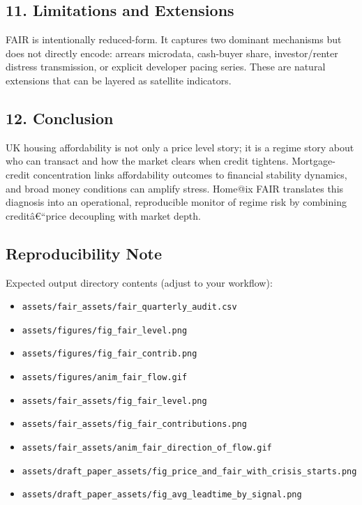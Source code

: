 \subsection{11. Limitations and
Extensions}\label{limitations-and-extensions}

FAIR is intentionally reduced-form. It captures two dominant mechanisms
but does not directly encode: arrears microdata, cash-buyer share,
investor/renter distress transmission, or explicit developer pacing
series. These are natural extensions that can be layered as satellite
indicators.

\subsection{12. Conclusion}\label{conclusion}

UK housing affordability is not only a price level story; it is a regime
story about who can transact and how the market clears when credit
tightens. Mortgage-credit concentration links affordability outcomes to
financial stability dynamics, and broad money conditions can amplify
stress. Home@ix FAIR translates this diagnosis into an operational,
reproducible monitor of regime risk by combining creditâ€``price
decoupling with market depth.

\subsection{Reproducibility Note}\label{reproducibility-note}

Expected output directory contents (adjust to your workflow):

\begin{itemize}
\tightlist
\item
  \texttt{assets/fair\_assets/fair\_quarterly\_audit.csv}
\item
  \texttt{assets/figures/fig\_fair\_level.png}
\item
  \texttt{assets/figures/fig\_fair\_contrib.png}
\item
  \texttt{assets/figures/anim\_fair\_flow.gif}
\item
  \texttt{assets/fair\_assets/fig\_fair\_level.png}
\item
  \texttt{assets/fair\_assets/fig\_fair\_contributions.png}
\item
  \texttt{assets/fair\_assets/anim\_fair\_direction\_of\_flow.gif}
\item
  \texttt{assets/draft\_paper\_assets/fig\_price\_and\_fair\_with\_crisis\_starts.png}
\item
  \texttt{assets/draft\_paper\_assets/fig\_avg\_leadtime\_by\_signal.png}
\end{itemize}

